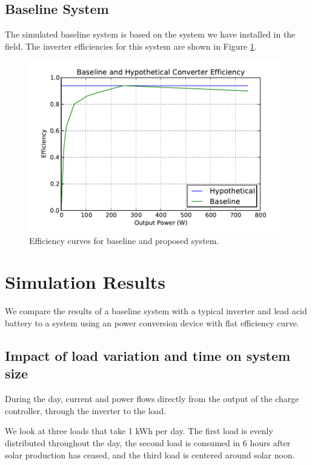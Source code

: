 \documentclass[conference]{IEEEtran}
\begin{document}
\subsection{Baseline System}
The simulated baseline system is based on the system we have
installed in the field.
The inverter efficiencies for this system are shown in Figure
\ref{inverter_curves}.

\begin{figure}[]
\begin{center}
\includegraphics[width=\columnwidth]{figures/inverter_curves.pdf}
\end{center}
\caption{Efficiency curves for baseline and proposed system.}
\label{inverter_curves}
\end{figure}

\section{Simulation Results}

We compare the results of a baseline system with a typical
inverter and lead acid battery to a system using an
power conversion device with flat efficiency curve.

\subsection{Impact of load variation and time on system size}

During the day, current and power flows directly from the output of
the charge controller, through the inverter to the load.

We look at three loads that take 1 kWh per day.
The first load is
evenly distributed throughout the day, the second load is
consumed in 6 hours after solar production has ceased, and the third
load is centered around solar noon.
\end{document}
